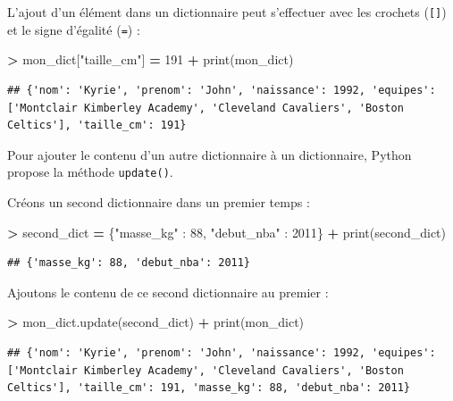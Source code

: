 \documentclass[12pt,]{book}
\newenvironment{Shaded}{\begin{snugshade}}{\end{snugshade}}
\newcommand{\DecValTok}[1]{\textcolor[rgb]{0.00,0.00,0.81}{#1}}
\newcommand{\StringTok}[1]{\textcolor[rgb]{0.31,0.60,0.02}{#1}}
\newcommand{\OperatorTok}[1]{\textcolor[rgb]{0.81,0.36,0.00}{\textbf{#1}}}
\newcommand{\BuiltInTok}[1]{#1}
\newcommand{\NormalTok}[1]{#1}
\numberwithin{equation}{section}
\numberwithin{countremarque}{section}
\begin{document}
L'ajout d'un élément dans un dictionnaire peut s'effectuer avec les
crochets (\texttt{{[}{]}}) et le signe d'égalité (\texttt{=}) :

\begin{Shaded}
\begin{Highlighting}[]
\OperatorTok{>}\NormalTok{ mon_dict[}\StringTok{"taille_cm"}\NormalTok{] }\OperatorTok{=} \DecValTok{191}
\OperatorTok{+} \BuiltInTok{print}\NormalTok{(mon_dict)}
\end{Highlighting}
\end{Shaded}

\begin{lstlisting}
## {'nom': 'Kyrie', 'prenom': 'John', 'naissance': 1992, 'equipes': ['Montclair Kimberley Academy', 'Cleveland Cavaliers', 'Boston Celtics'], 'taille_cm': 191}
\end{lstlisting}

Pour ajouter le contenu d'un autre dictionnaire à un dictionnaire,
Python propose la méthode \texttt{update()}.

Créons un second dictionnaire dans un premier temps :

\begin{Shaded}
\begin{Highlighting}[]
\OperatorTok{>}\NormalTok{ second_dict }\OperatorTok{=}\NormalTok{ \{}\StringTok{"masse_kg"}\NormalTok{ : }\DecValTok{88}\NormalTok{, }\StringTok{"debut_nba"}\NormalTok{ : }\DecValTok{2011}\NormalTok{\}}
\OperatorTok{+} \BuiltInTok{print}\NormalTok{(second_dict)}
\end{Highlighting}
\end{Shaded}

\begin{lstlisting}
## {'masse_kg': 88, 'debut_nba': 2011}
\end{lstlisting}

Ajoutons le contenu de ce second dictionnaire au premier :

\begin{Shaded}
\begin{Highlighting}[]
\OperatorTok{>}\NormalTok{ mon_dict.update(second_dict)}
\OperatorTok{+} \BuiltInTok{print}\NormalTok{(mon_dict)}
\end{Highlighting}
\end{Shaded}

\begin{lstlisting}
## {'nom': 'Kyrie', 'prenom': 'John', 'naissance': 1992, 'equipes': ['Montclair Kimberley Academy', 'Cleveland Cavaliers', 'Boston Celtics'], 'taille_cm': 191, 'masse_kg': 88, 'debut_nba': 2011}
\end{lstlisting}
\end{document}
